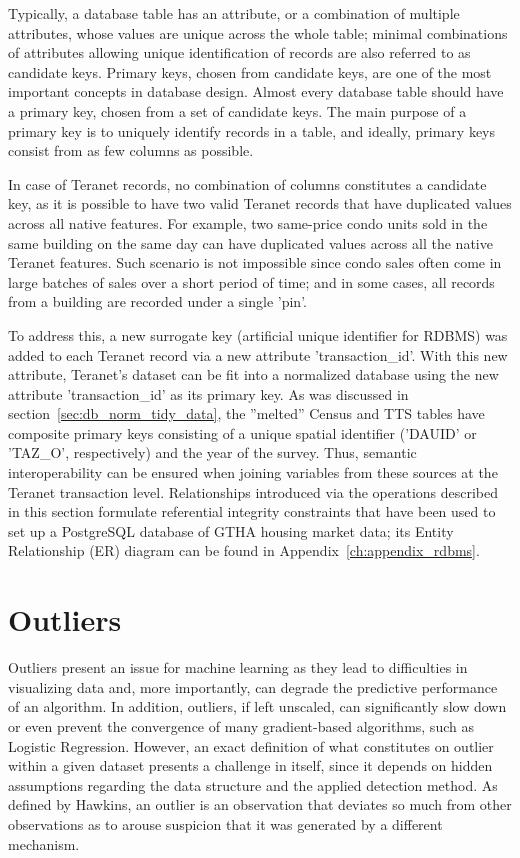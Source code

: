 Typically, a database table has an attribute, or a combination of multiple attributes, whose values are unique across the whole table;
minimal combinations of attributes allowing unique identification of records are also referred to as candidate keys.
Primary keys, chosen from candidate keys, are one of the most important concepts in database design.
Almost every database table should have a primary key, chosen from a set of candidate keys.
The main purpose of a primary key is to uniquely identify records in a table, and ideally, primary keys consist from as few columns as possible.

In case of Teranet records, no combination of columns constitutes a candidate key, as it is possible to have two valid Teranet records that have duplicated values across all native features.
For example, two same-price condo units sold in the same building on the same day can have duplicated values across all the native Teranet features.
Such scenario is not impossible since condo sales often come in large batches of sales over a short period of time;
and in some cases, all records from a building are recorded under a single 'pin'.

To address this, a new surrogate key (artificial unique identifier for RDBMS) was added to each Teranet record via a new attribute 'transaction\_id'.
With this new attribute, Teranet's dataset can be fit into a normalized database using the new attribute 'transaction\_id' as its primary key.
As was discussed in section~\ref{sec:db_norm_tidy_data}, the ''melted'' Census and TTS tables have composite primary keys consisting of a unique spatial identifier ('DAUID' or 'TAZ\_O', respectively) and the year of the survey.
Thus, semantic interoperability can be ensured when joining variables from these sources at the Teranet transaction level.
Relationships introduced via the operations described in this section formulate referential integrity constraints that have been used to set up a PostgreSQL database of GTHA housing market data;
its Entity Relationship (ER) diagram can be found in Appendix~\ref{ch:appendix_rdbms}.

\section{Outliers} \label{sec:outliers}

Outliers present an issue for machine learning as they lead to difficulties in visualizing data and, more importantly, can degrade the predictive performance of an algorithm.
In addition, outliers, if left unscaled, can significantly slow down or even prevent the convergence of many gradient-based algorithms, such as Logistic Regression\cite{Scikit-learndevelopers2019b}.
However, an exact definition of what constitutes on outlier within a given dataset presents a challenge in itself, since it depends on hidden assumptions regarding the data structure and the applied detection method\cite{Ben-Gal2005}.
As defined by Hawkins, an outlier is an observation that deviates so much from other observations as to arouse suspicion that it was generated by a different mechanism\cite{Hawkins1980}.

